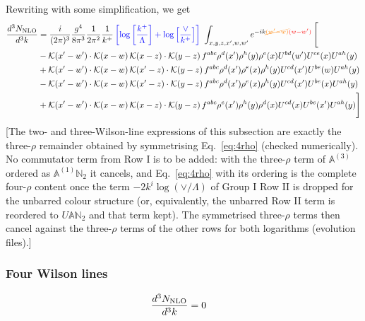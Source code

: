 \documentclass[aps,prd,amsmath,amssymb,nofootinbib]{revtex4-2}
\def\mf#1{\mathbb{#1}}
\numberwithin{equation}{section}
\begin{document}
Rewriting with some simplification, we get
\begin{align}
      \frac{d^{3}N_{\rm NLO}}{d^{3}k} & = \frac{i}{(2\pi)^{3}}\frac{g^{4}}{8\pi^{3}}\frac{1}{2\pi^{2}} \frac{1}{k^{+}}\,{\color{blue}\left[\log{\left[\frac{k^{+}}{\Lambda}\right]}+\log{\left[\frac{\vee}{k^{+}}\right]}\right]}\,\,\int_{x,y,z,x^{\prime},w,w^{\prime}}e^{-ik{\color{orange}\cancel{(w^{\prime}-w)}}{\color{red}(w-w^{\prime})}}\, \Bigg[\notag \\ & - \mathcal{K}(x'-w')\cdot \mathcal{K}(x-w)\, \mathcal{K}(x-z)\cdot \mathcal{K}(y-z)\, f^{a b c} \rho^{d}(x') \rho^{h}(y) \rho^{e}(x) U^{bd}(w') U^{ce}(x) U^{a h}(y)\nonumber\\
    &+ \mathcal{K}(x'-w')\cdot \mathcal{K}(x-w)\,\mathcal{K}(x'-z)\cdot \mathcal{K}(y-z)\, f^{a b c} \rho^{d}(x') \rho^{e}(x) \rho^{h}(y) U^{cd}(x') U^{be}(w) U^{a h}(y)\nonumber\\
    &- \mathcal{K}(x'-w')\cdot \mathcal{K}(x-w)\,\mathcal{K}(x'-z)\cdot \mathcal{K}(y-z)\, f^{a b c} \rho^{d}(x') \rho^{e}(x) \rho^{h}(y) U^{cd}(x') U^{b e}(x) U^{a h}(y)\nonumber\\
    &+  \mathcal{K}(x'-w')\cdot \mathcal{K}(x-w)\, \mathcal{K}(x-z)\cdot \mathcal{K}(y-z)\, f^{a b c} \rho^{e}(x') \rho^{h}(y) \rho^{d}(x) U^{cd}(x) U^{b e}(x') U^{a h}(y) \Bigg]
\end{align} {\color{red}[The two- and three-Wilson-line expressions of this subsection are exactly the three-$\rho$ remainder obtained by symmetrising Eq.~\eqref{eq:4rho} (checked numerically). No commutator term from Row I is to be added: with the three-$\rho$ term of $\mf{A}^{(3)}$ ordered as $\mf{A}^{(1)}\mf{N}_{2}$ it cancels, and Eq.~\eqref{eq:4rho} with its ordering is the complete four-$\rho$ content once the term $-2k^{i}\log(\vee/\Lambda)$ of Group I Row II is dropped for the unbarred colour structure (or, equivalently, the unbarred Row II term is reordered to $U\mf{A}\mf{N}_{2}$ and that term kept). The symmetrised three-$\rho$ terms then cancel against the three-$\rho$ terms of the other rows for both logarithms (evolution files).]}\par\noindent 
\subsubsection{Four Wilson lines}
\begin{align}
    \frac{d^{3}N_{\rm NLO}}{d^{3}k} & = 0 
\end{align}    
\end{document}
